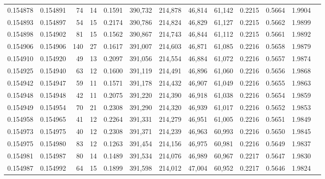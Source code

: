 \begin{tabular}{rrrrrrrrrrrrr}
0.154878 & 0.154891 &    74 &  14 &                                     0.1591 & 390,732 & 214,878 &  46,814 &  61,142 & 0.2215 & 0.5664 & 1.9904 \\
0.154893 & 0.154897 &    54 &  15 &                                     0.2174 & 390,786 & 214,824 &  46,829 &  61,127 & 0.2215 & 0.5662 & 1.9899 \\
0.154898 & 0.154902 &    81 &  15 &                                     0.1562 & 390,867 & 214,743 &  46,844 &  61,112 & 0.2215 & 0.5661 & 1.9892 \\
0.154906 & 0.154906 &   140 &  27 &                                     0.1617 & 391,007 & 214,603 &  46,871 &  61,085 & 0.2216 & 0.5658 & 1.9879 \\
0.154910 & 0.154920 &    49 &  13 &                                     0.2097 & 391,056 & 214,554 &  46,884 &  61,072 & 0.2216 & 0.5657 & 1.9874 \\
0.154925 & 0.154940 &    63 &  12 &                                     0.1600 & 391,119 & 214,491 &  46,896 &  61,060 & 0.2216 & 0.5656 & 1.9868 \\
0.154942 & 0.154947 &    59 &  11 &                                     0.1571 & 391,178 & 214,432 &  46,907 &  61,049 & 0.2216 & 0.5655 & 1.9863 \\
0.154948 & 0.154948 &    42 &  11 &                                     0.2075 & 391,220 & 214,390 &  46,918 &  61,038 & 0.2216 & 0.5654 & 1.9859 \\
0.154949 & 0.154954 &    70 &  21 &                                     0.2308 & 391,290 & 214,320 &  46,939 &  61,017 & 0.2216 & 0.5652 & 1.9853 \\
0.154958 & 0.154965 &    41 &  12 &                                     0.2264 & 391,331 & 214,279 &  46,951 &  61,005 & 0.2216 & 0.5651 & 1.9849 \\
0.154973 & 0.154975 &    40 &  12 &                                     0.2308 & 391,371 & 214,239 &  46,963 &  60,993 & 0.2216 & 0.5650 & 1.9845 \\
0.154975 & 0.154980 &    83 &  12 &                                     0.1263 & 391,454 & 214,156 &  46,975 &  60,981 & 0.2216 & 0.5649 & 1.9837 \\
0.154981 & 0.154987 &    80 &  14 &                                     0.1489 & 391,534 & 214,076 &  46,989 &  60,967 & 0.2217 & 0.5647 & 1.9830 \\
0.154987 & 0.154992 &    64 &  15 &                                     0.1899 & 391,598 & 214,012 &  47,004 &  60,952 & 0.2217 & 0.5646 & 1.9824 \\

\end{tabular}
